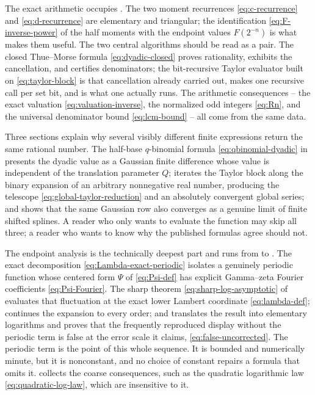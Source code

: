 \documentclass[11pt,oneside]{article}
\theoremstyle{definition}
\theoremstyle{remark}
\begin{document}
The exact arithmetic occupies .  The two
moment recurrences \eqref{eq:c-recurrence} and \eqref{eq:d-recurrence} are elementary and
triangular; the identification \eqref{eq:F-inverse-power} of the half moments with the
endpoint values $F(2^{-n})$ is what makes them useful.  The two central algorithms should be
read as a pair.  The closed Thue--Morse formula \eqref{eq:dyadic-closed} proves rationality,
exhibits the cancellation, and certifies denominators; the bit-recursive Taylor evaluator
built on \eqref{eq:taylor-block} is that cancellation already carried out, makes one
recursive call per set bit, and is what one actually runs.  The arithmetic consequences --
the exact valuation \eqref{eq:valuation-inverse}, the normalized odd integers \eqref{eq:Rn},
and the universal denominator bound \eqref{eq:lcm-bound} -- all come from the same data.

Three sections explain why several visibly different finite expressions return the same
rational number.  The half-base $q$-binomial formula \eqref{eq:qbinomial-dyadic} in
 presents the dyadic value as a Gaussian finite difference whose value is
independent of the translation parameter $Q$;  iterates the
Taylor block along the binary expansion of an arbitrary nonnegative real number, producing
the telescope \eqref{eq:global-taylor-reduction} and an absolutely convergent global series;
and  shows that the same Gaussian row also converges as a genuine
limit of finite shifted splines.  A reader who only wants to evaluate the function may skip
all three; a reader who wants to know why the published formulas agree should not.

The endpoint analysis is the technically deepest part and runs from
 to .  The exact
decomposition \eqref{eq:Lambda-exact-periodic} isolates a genuinely periodic function whose
centered form $\Psi$ of \eqref{eq:Psi-def} has explicit Gamma--zeta Fourier coefficients
\eqref{eq:Psi-Fourier}.  The sharp theorem \eqref{eq:sharp-log-asymptotic} of
 evaluates that fluctuation at the exact lower Lambert coordinate
\eqref{eq:lambda-def};  continues the expansion to every order; and
 translates the result into elementary logarithms and proves
that the frequently reproduced display without the periodic term is false at the error scale
it claims, \eqref{eq:false-uncorrected}.  The periodic term is the point of this whole
sequence.  It is bounded and numerically minute, but it is nonconstant, and no choice of
constant repairs a formula that omits it.   collects the
coarse consequences, such as the quadratic logarithmic law \eqref{eq:quadratic-log-law},
which are insensitive to it.
\end{document}
